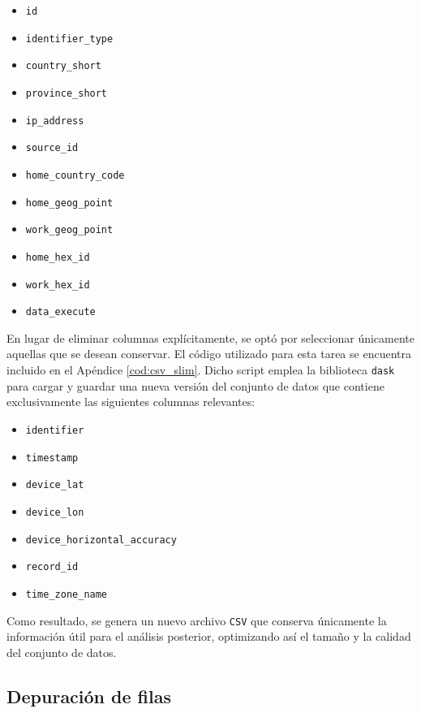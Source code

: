 \begin{itemize}
    \item \texttt{id}
    \item \texttt{identifier\_type}
    \item \texttt{country\_short}
    \item \texttt{province\_short}
    \item \texttt{ip\_address}
    \item \texttt{source\_id}
    \item \texttt{home\_country\_code}
    \item \texttt{home\_geog\_point}
    \item \texttt{work\_geog\_point}
    \item \texttt{home\_hex\_id}
    \item \texttt{work\_hex\_id}
    \item \texttt{data\_execute}
\end{itemize}

En lugar de eliminar columnas explícitamente, se optó por seleccionar únicamente aquellas que se desean conservar. El código utilizado para esta tarea se encuentra incluido en el Apéndice \ref{cod:csv_slim}. Dicho script emplea la biblioteca \texttt{dask} para cargar y guardar una nueva versión del conjunto de datos que contiene exclusivamente las siguientes columnas relevantes:

\begin{itemize}
    \item \texttt{identifier}
    \item \texttt{timestamp}
    \item \texttt{device\_lat}
    \item \texttt{device\_lon}
    \item \texttt{device\_horizontal\_accuracy}
    \item \texttt{record\_id}
    \item \texttt{time\_zone\_name}
\end{itemize}

Como resultado, se genera un nuevo archivo \texttt{CSV} que conserva únicamente la información útil para el análisis posterior, optimizando así el tamaño y la calidad del conjunto de datos.


\subsection{Depuración de filas}
\label{subsec:depuracion_filas}

